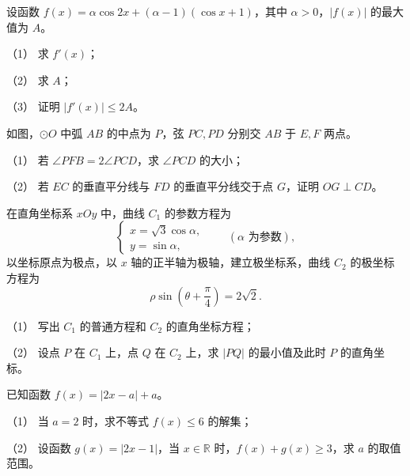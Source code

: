 \begin{question}
设函数 \(f(x)=\alpha\cos2x+(\alpha-1)(\cos x+1)\)，其中 \(\alpha>0\)，\(|f(x)|\) 的最大值为 \(A\)。

（1） 求 \(f'(x)\)；

（2） 求 \(A\)；

（3） 证明 \(|f'(x)|\leq2A\)。

\Needspace{0.4\textheight}
\end{question}
\begin{question}
如图，\(\odot O\) 中弧 \(AB\) 的中点为 \(P\)，弦 \(PC,PD\) 分别交 \(AB\) 于 \(E,F\) 两点。

（1） 若 \(\angle PFB=2\angle PCD\)，求 \(\angle PCD\) 的大小；

（2） 若 \(EC\) 的垂直平分线与 \(FD\) 的垂直平分线交于点 \(G\)，证明 \(OG\perp CD\)。
\nopagebreak[4]
\begin{center}\end{center}
\nopagebreak[4]
\end{question}
\begin{question}
在直角坐标系 \(xOy\) 中，曲线 \(C_1\) 的参数方程为
\nopagebreak[4]
\[
\begin{cases}
x=\sqrt3\cos\alpha,\\
y=\sin\alpha,
\end{cases}\qquad(\alpha\text{ 为参数}),
\]
以坐标原点为极点，以 \(x\) 轴的正半轴为极轴，建立极坐标系，曲线 \(C_2\) 的极坐标方程为
\nopagebreak[4]
\[
\rho\sin\left(\theta+\frac\pi4\right)=2\sqrt2.
\]

（1） 写出 \(C_1\) 的普通方程和 \(C_2\) 的直角坐标方程；

（2） 设点 \(P\) 在 \(C_1\) 上，点 \(Q\) 在 \(C_2\) 上，求 \(|PQ|\) 的最小值及此时 \(P\) 的直角坐标。

\end{question}
\begin{question}
已知函数 \(f(x)=|2x-a|+a\)。

（1） 当 \(a=2\) 时，求不等式 \(f(x)\leq6\) 的解集；

（2） 设函数 \(g(x)=|2x-1|\)，当 \(x\in\mathbb R\) 时，\(f(x)+g(x)\geq3\)，求 \(a\) 的取值范围。

\end{question}